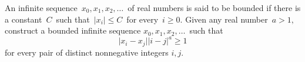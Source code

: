An infinite sequence $ \,x_{0},x_{1},x_{2},\ldots \,$ of real numbers is said to be bounded if there is a constant $ \,C\,$ such that $ \, \vert x_{i} \vert \leq C\,$ for every $ \,i\geq 0$. Given any real number $ \,a > 1,\,$ construct a bounded infinite sequence $ x_{0},x_{1},x_{2},\ldots \,$ such that\[ \vert x_{i} - x_{j} \vert \vert i - j \vert^{a}\geq 1\]
for every pair of distinct nonnegative integers $ i, j$.
